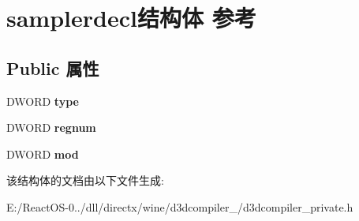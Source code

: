 \hypertarget{structsamplerdecl}{}\section{samplerdecl结构体 参考}
\label{structsamplerdecl}
\subsection*{Public 属性}
\begin{DoxyCompactItemize}
\item 
\mbox{\label{structsamplerdecl_a4cf6dfa8ec5f1b7c146947e03aeb9e46}} 
D\+W\+O\+RD {\bfseries type}
\item 
\mbox{\label{structsamplerdecl_a8eb152caaad06021e161b08808569512}} 
D\+W\+O\+RD {\bfseries regnum}
\item 
\mbox{\label{structsamplerdecl_a4345bf204cd0a7fd8247dc0e783c6d97}} 
D\+W\+O\+RD {\bfseries mod}
\end{DoxyCompactItemize}


该结构体的文档由以下文件生成\+:\begin{DoxyCompactItemize}
\item 
E\+:/\+React\+O\+S-\/0../dll/directx/wine/d3dcompiler\+\_/d3dcompiler\+\_\+private.\+h\end{DoxyCompactItemize}
